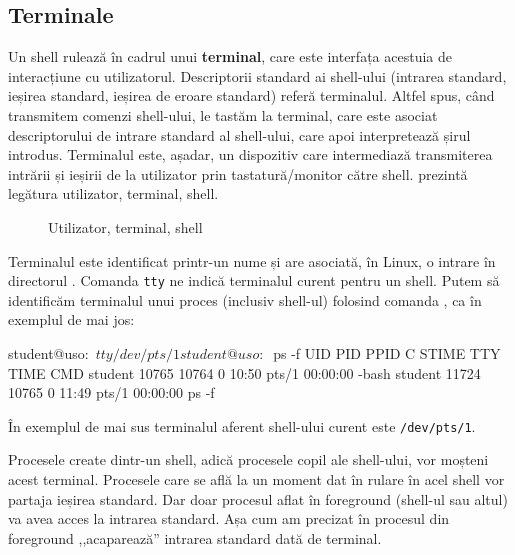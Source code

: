 \subsection{Terminale}
\label{sec:procese-interactivitate-terminale}

Un shell rulează în cadrul unui \textbf{terminal}, care este interfața acestuia de
interacțiune cu utilizatorul. Descriptorii standard ai shell-ului (intrarea
standard, ieșirea standard, ieșirea de eroare standard) referă terminalul.
Altfel spus, când transmitem comenzi shell-ului, le tastăm la terminal, care
este asociat descriptorului de intrare standard al shell-ului, care apoi
interpretează șirul introdus. Terminalul este, așadar, un dispozitiv care
intermediază transmiterea intrării și ieșirii de la utilizator prin tastatură/monitor către
shell.  prezintă legătura utilizator, terminal, shell.

\begin{figure}[!htbp]
	\centering
	\def\svgwidth{0.8\textwidth}
	
	\caption{Utilizator, terminal, shell}
	\label{fig:process-termina-shell}
\end{figure}

Terminalul este identificat printr-un nume și are asociată, în Linux, o intrare
în directorul . Comanda \texttt{tty} ne indică terminalul curent pentru un shell.
Putem să identificăm terminalul unui proces (inclusiv shell-ul) folosind comanda
, ca în exemplul de mai jos:

\begin{screen}
student@uso:~$ tty
/dev/pts/1
student@uso:~$ ps -f
UID        PID  PPID  C STIME TTY          TIME CMD
student  10765 10764  0 10:50 pts/1    00:00:00 -bash
student  11724 10765  0 11:49 pts/1    00:00:00 ps -f
\end{screen}

În exemplul de mai sus terminalul aferent shell-ului curent este \texttt{/dev/pts/1}.

Procesele create dintr-un shell, adică procesele copil ale shell-ului, vor
moșteni acest terminal. Procesele care se află la un moment dat în rulare în
acel shell vor partaja ieșirea standard. Dar doar procesul aflat în foreground
(shell-ul sau altul) va avea acces la intrarea standard. Așa cum am precizat în
 procesul
din foreground ,,acaparează'' intrarea standard dată de terminal.

